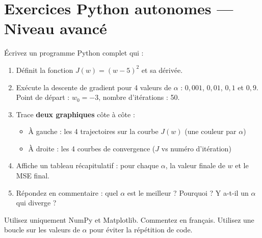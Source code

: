 \section*{Exercices Python autonomes --- Niveau avanc\'{e}}


\'{E}crivez un programme Python complet qui :

\begin{enumerate}[label=\alph*)]
    \item D\'{e}finit la fonction $J(w) = (w - 5)^2$ et sa d\'{e}riv\'{e}e.

    \item Ex\'{e}cute la descente de gradient pour 4 valeurs de $\alpha$ :
        $0{,}001$, $0{,}01$, $0{,}1$ et $0{,}9$.
        Point de d\'{e}part : $w_0 = -3$, nombre d'it\'{e}rations : 50.

    \item Trace \textbf{deux graphiques} c\^{o}te \`{a} c\^{o}te :
    \begin{itemize}
        \item \`{A} gauche : les 4 trajectoires sur la courbe $J(w)$ (une couleur par $\alpha$)
        \item \`{A} droite : les 4 courbes de convergence ($J$ vs num\'{e}ro d'it\'{e}ration)
    \end{itemize}

    \item Affiche un tableau r\'{e}capitulatif :
        pour chaque $\alpha$, la valeur finale de $w$ et le MSE final.

    \item R\'{e}pondez en commentaire : quel $\alpha$ est le meilleur ? Pourquoi ?
        Y a-t-il un $\alpha$ qui diverge ?
\end{enumerate}

\begin{attentionbox}[Consignes]
    Utilisez uniquement NumPy et Matplotlib. Commentez en fran\c{c}ais.
    Utilisez une boucle sur les valeurs de $\alpha$ pour \'{e}viter la r\'{e}p\'{e}tition de code.
\end{attentionbox}


